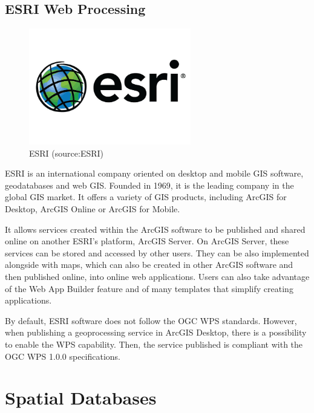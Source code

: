 \subsection{ESRI Web Processing}

\begin{figure}[H] \centering
      \includegraphics[width=200pt]{./pictures/esri.png}
      \caption[ESRI logo]{ESRI (source:ESRI)}
      \label{fig:ESRI}
  \end{figure}

ESRI is an international company oriented on desktop and mobile GIS software, geodatabases and web GIS. Founded in 1969, it is the leading company in the global GIS market. It offers a variety of GIS products, including ArcGIS for Desktop, ArcGIS Online or ArcGIS for Mobile. 

It allows services created within the ArcGIS software to be published and shared online on another ESRI's platform, ArcGIS Server. On ArcGIS Server, these services can be stored and accessed by other users. They can be also implemented alongside with maps, which can also be created in other ArcGIS software and then published online, into online web applications. Users can also take advantage of the Web App Builder feature and of many templates that simplify creating applications.

By default, ESRI software does not follow the OGC WPS standards. However, when publishing a geoprocessing service in ArcGIS Desktop, there is a possibility to enable the WPS capability. Then, the service published is compliant with the OGC WPS 1.0.0 specifications.

\section{Spatial Databases}

